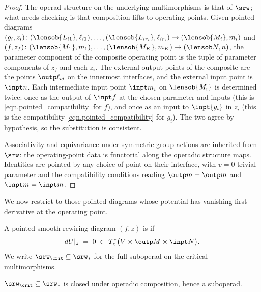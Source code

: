\begin{proof}
The operad structure on the underlying multimorphisms is that of $\srw$; what needs checking is that composition lifts to operating points. Given pointed diagrams $(g_i,z_i)\colon(\lensob{L_{i1}},\ell_{i1}),\ldots,(\lensob{L_{ir_i}},\ell_{ir_i})\to(\lensob{M_i},m_i)$ and $(f,z_f)\colon(\lensob{M_1},m_1),\ldots,(\lensob{M_K},m_K)\to(\lensob N,n)$, the parameter component of the composite operating point is the tuple of parameter components of $z_f$ and each $z_i$. The external output points of the composite are the points $\outp\ell_{ij}$ on the innermost interfaces, and the external input point is $\inpt n$. Each intermediate input point $\inpt m_i$ on $\lensob{M_i}$ is determined twice: once as the output of $\inpt f$ at the chosen parameter and inputs (this is \eqref{eqn.pointed_compatibility} for $f$), and once as an input to $\inpt{g_i}$ in $z_i$ (this is the compatibility \eqref{eqn.pointed_compatibility} for $g_i$). The two agree by hypothesis, so the substitution is consistent.

Associativity and equivariance under symmetric group actions are inherited from $\srw$: the operating-point data is functorial along the operadic structure maps. Identities are pointed by any choice of point on their interface, with $v=0$ trivial parameter and the compatibility conditions reading $\outp m=\outp m$ and $\inpt m=\inpt m$.\qedhere
\end{proof}

We now restrict to those pointed diagrams whose potential has vanishing first derivative at the operating point.

\begin{definition}\label{def.srw_crit}
A pointed smooth rewiring diagram $(f,z)$ is  if
\begin{equation}\label{eqn.crit}
dU|_z\;=\;0\;\in\;T^*_z\bigl(V\times\outp M\times\inpt N\bigr).
\end{equation}
We write $\srw_{\crit}\subseteq\srw_*$ for the full suboperad on the critical multimorphisms.
\end{definition}

\begin{proposition}\label{prop.srw_crit_suboperad}
$\srw_{\crit}\subseteq\srw_*$ is closed under operadic composition, hence a suboperad.
\end{proposition}

